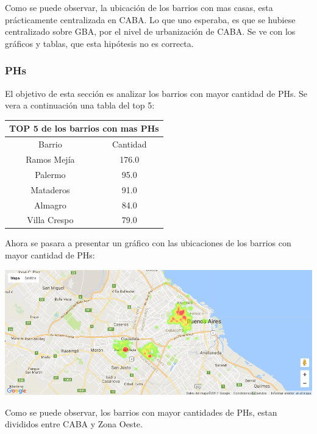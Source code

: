 \documentclass[a4paper, 10pt]{article}
\begin{document}
				Como se puede observar, la ubicación de los barrios con mas casas, esta prácticamente centralizada en CABA. Lo que uno esperaba, es que se hubiese centralizado sobre GBA, por el nivel de urbanización de CABA. Se ve con los gráficos y tablas, que esta hipótesis no es correcta.
				
				\subsubsection{PHs}
				
				El objetivo de esta sección es analizar los barrios con mayor cantidad de PHs. Se vera a continuación una tabla del top 5:
				
				\begin{center}
						\begin{tabular}{ |c|c| }
							\hline
							\multicolumn{2}{|c|}{TOP 5 de los barrios con mas PHs}\\
							\hline
							\hline
							Barrio & Cantidad\\
							\hline
							Ramos Mejía & 176.0 \\
							Palermo & 95.0 \\
							Mataderos &	91.0 \\
							Almagro & 84.0 \\
							Villa Crespo & 79.0 \\
							\hline
						\end{tabular}
					\end{center}
				
				Ahora se pasara a presentar un gráfico con las ubicaciones de los barrios con mayor cantidad de PHs:
				\begin{center}
   		    				\includegraphics[width=\textwidth]{images/ubicMPH}
				\end{center}
				
				Como se puede observar, los barrios con mayor cantidades de PHs, estan divididos entre CABA y Zona Oeste.
				
\end{document}
